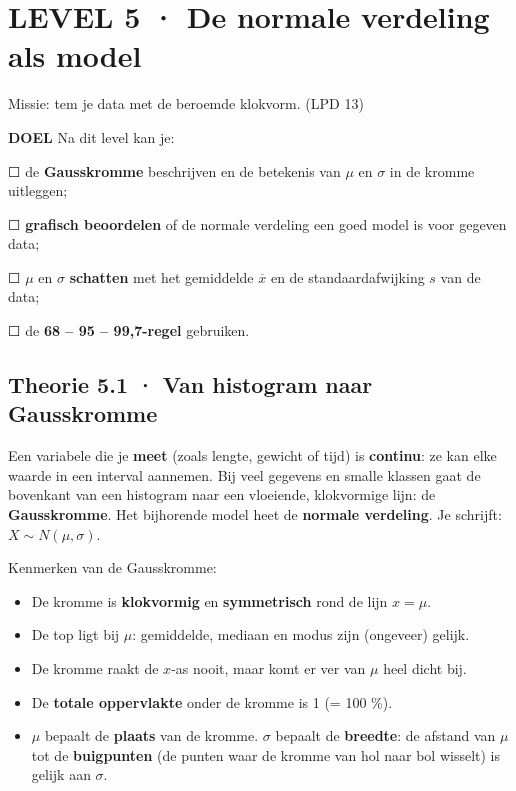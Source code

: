 \section{LEVEL 5 · De normale verdeling als model}

\begin{missie}
Missie: tem je data met de beroemde klokvorm. (LPD 13)
\end{missie}

\begin{doel}
\textbf{DOEL} \quad Na dit level kan je:

☐ de \textbf{Gausskromme} beschrijven en de betekenis van $\mu$ en $\sigma$ in de kromme uitleggen;

☐ \textbf{grafisch beoordelen} of de normale verdeling een goed model is voor gegeven data;

☐ $\mu$ en $\sigma$ \textbf{schatten} met het gemiddelde $\overline{x}$ en de standaardafwijking $s$ van de data;

☐ de \textbf{68 – 95 – 99,7-regel} gebruiken.
\end{doel}

\subsection*{Theorie 5.1 · Van histogram naar Gausskromme}

\begin{theorie}
Een variabele die je \textbf{meet} (zoals lengte, gewicht of tijd) is \textbf{continu}: ze kan elke waarde in een interval aannemen. Bij veel gegevens en smalle klassen gaat de bovenkant van een histogram naar een vloeiende, klokvormige lijn: de \textbf{Gausskromme}. Het bijhorende model heet de \textbf{normale verdeling}. Je schrijft: $X\sim N(\mu,\sigma)$.

Kenmerken van de Gausskromme:

\begin{itemize}
\item De kromme is \textbf{klokvormig} en \textbf{symmetrisch} rond de lijn $x=\mu$.
\item De top ligt bij $\mu$: gemiddelde, mediaan en modus zijn (ongeveer) gelijk.
\item De kromme raakt de $x$-as nooit, maar komt er ver van $\mu$ heel dicht bij.
\item De \textbf{totale oppervlakte} onder de kromme is 1 (= 100 \%).
\item $\mu$ bepaalt de \textbf{plaats} van de kromme. $\sigma$ bepaalt de \textbf{breedte}: de afstand van $\mu$ tot de \textbf{buigpunten} (de punten waar de kromme van hol naar bol wisselt) is gelijk aan $\sigma$.
\end{itemize}
\end{theorie}


